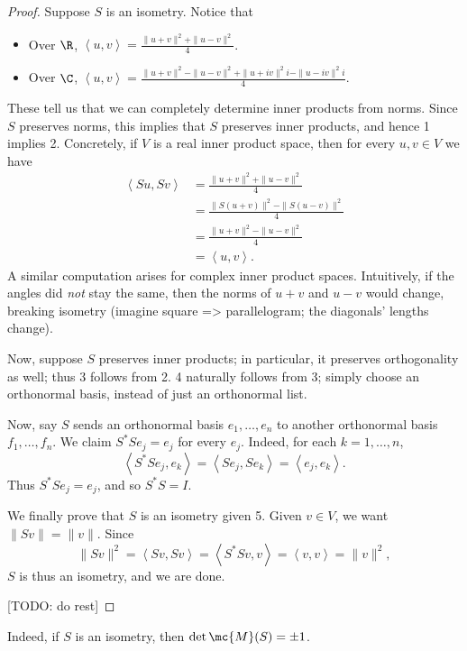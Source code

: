 \documentclass[math0540-lecture-notes.tex]{subfiles}
\begin{document}
\begin{proof}[Proof]
  Suppose $S$ is an isometry. Notice that
  \begin{itemize}
    \item Over $\R$, $\left<u,v \right> =\frac{\|u+v\|^2+\|u-v\|^2}{4}$. 
    \item Over $\C$, $\left<u,v \right> =\frac{\|u+v\|^2-\|u-v\|^2+\|u+iv\|^2i-\|u-iv\|^2i}{4}$.
  \end{itemize}
  These tell us that we can completely determine inner products from norms. Since $S$ preserves
  norms, this implies that $S$ preserves inner products, and hence 1 implies 2. Concretely, if $V$
  is a real inner product space, then for every $u,v\in V$ we have
  \begin{align*}
    \left<Su,Sv \right> &= \frac{\|u+v\|^2+\|u-v\|^2}{4} \\
                        &= \frac{\|S(u+v)\|^2-\|S(u-v)\|^2}{4} \\
                        &= \frac{\|u+v\|^2-\|u-v\|^2}{4} \\
                        &=\left<u,v \right> 
  .\end{align*} A similar computation arises for complex inner product spaces. Intuitively, if the
  angles did \textit{not} stay the same, then the norms of $u+v$ and $u-v$ would change, breaking
  isometry (imagine square => parallelogram; the diagonals' lengths change).

  Now, suppose $S$ preserves inner products; in particular, it preserves orthogonality as well; thus
  3 follows from 2. 4 naturally follows from 3; simply choose an orthonormal basis, instead of just
  an orthonormal list.

  Now, say $S$ sends an orthonormal basis $e_1,\ldots,e_n$ to another orthonormal basis
  $f_1,\ldots,f_n$. We claim $S^*Se_j=e_j$ for every $e_j$. Indeed, for each $k=1,\ldots,n$, \[
    \left<S^*Se_j,e_k \right> =\left<Se_j,Se_k \right> =\left<e_j,e_k \right> 
  .\] Thus $S^*Se_j=e_j$, and so $S^*S=I$.

  We finally prove that $S$ is an isometry given 5. Given $v\in V$, we want $\|Sv\|=\|v\|$. Since \[
    \|Sv\|^2=\left<Sv,Sv \right> =\left<S^*Sv,v \right> =\left<v,v \right> =\|v\|^2
  ,\] $S$ is thus an isometry, and we are done.

  [TODO: do rest]
\end{proof}

\begin{remark}
  Indeed, if $S$ is an isometry, then $\det{\mc{M}(S)}=\pm 1$.
\end{remark}
\end{document}
